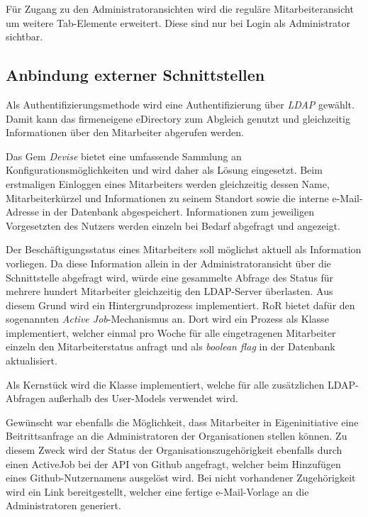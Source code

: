 Für Zugang zu den Administratoransichten wird die reguläre Mitarbeiteransicht um weitere Tab-Elemente
erweitert. Diese sind nur bei Login als Administrator sichtbar.

\subsection{Anbindung externer Schnittstellen}
\label{sec:Anbindung externer Schnittstellen}
Als Authentifizierungsmethode wird eine Authentifizierung über \textit{\acs{LDAP}} gewählt. Damit
kann das firmeneigene eDirectory zum Abgleich genutzt und gleichzeitig Informationen über
den Mitarbeiter abgerufen werden.

Das Gem \textit{Devise} bietet eine umfassende Sammlung an Konfigurationsmöglichkeiten und wird
daher als Lösung eingesetzt. Beim erstmaligen Einloggen eines Mitarbeiters werden gleichzeitig
dessen Name, Mitarbeiterkürzel und Informationen zu seinem Standort sowie die interne
e-Mail-Adresse in der Datenbank abgespeichert. Informationen zum jeweiligen Vorgesetzten des
Nutzers werden einzeln bei Bedarf abgefragt und angezeigt.

Der Beschäftigungsstatus eines Mitarbeiters soll möglichst aktuell als Information vorliegen. Da diese
Information allein in der Administratoransicht \bzw über die Schnittstelle abgefragt wird,
würde eine gesammelte Abfrage des Status für mehrere hundert Mitarbeiter gleichzeitig den LDAP-Server
überlasten. Aus diesem Grund wird ein Hintergrundprozess implementiert. RoR bietet dafür den
sogenannten \textit{Active Job}-Mechanismus an. Dort wird ein Prozess als Klasse implementiert,
welcher einmal pro Woche für alle eingetragenen Mitarbeiter einzeln den Mitarbeiterstatus anfragt
und als \textit{boolean flag} in der Datenbank aktualisiert.


Als Kernstück wird die Klasse  implementiert, welche für alle zusätzlichen
LDAP-Abfragen außerhalb des User-Models verwendet wird.


Gewünscht war ebenfalls die Möglichkeit, dass Mitarbeiter \ggfs in Eigeninitiative eine
Beitrittsanfrage an die Administratoren der Organisationen stellen können. Zu diesem Zweck wird der
Status der Organisationszugehörigkeit ebenfalls durch einen ActiveJob bei der API von Github
angefragt, welcher beim Hinzufügen eines Github-Nutzernamens ausgelöst wird.
Bei nicht vorhandener Zugehörigkeit wird ein Link bereitgestellt, welcher eine fertige e-Mail-Vorlage
an die Administratoren generiert.

